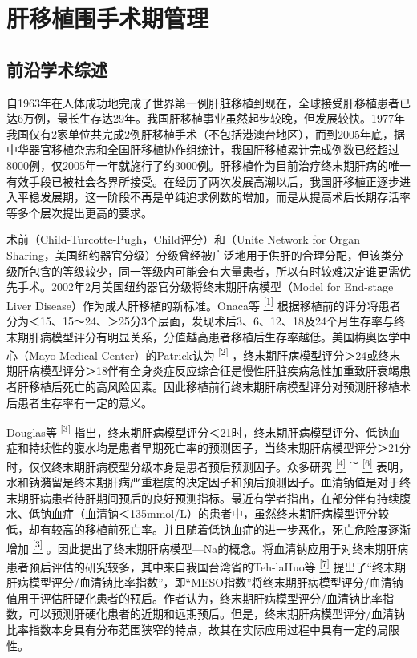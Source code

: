 \chapter{肝移植围手术期管理}

\section{前沿学术综述}

自1963年在人体成功地完成了世界第一例肝脏移植到现在，全球接受肝移植患者已达6万例，最长生存达29年。我国肝移植事业虽然起步较晚，但发展较快。1977年我国仅有2家单位共完成2例肝移植手术（不包括港澳台地区），而到2005年底，据中华器官移植杂志和全国肝移植协作组统计，我国肝移植累计完成例数已经超过8000例，仅2005年一年就施行了约3000例。肝移植作为目前治疗终末期肝病的唯一有效手段已被社会各界所接受。在经历了两次发展高潮以后，我国肝移植正逐步进入平稳发展期，这一阶段不再是单纯追求例数的增加，而是从提高术后长期存活率等多个层次提出更高的要求。

术前（Child-Turcotte-Pugh，Child评分）和（Unite Network for Organ
Sharing，美国纽约器官分级）分级曾经被广泛地用于供肝的合理分配，但该类分级所包含的等级较少，同一等级内可能会有大量患者，所以有时较难决定谁更需优先手术。2002年2月美国纽约器官分级将终末期肝病模型（Model
for End-stage Liver Disease）作为成人肝移植的新标准。Onaca等
\protect\hyperlink{text00020.htmlux5cux23ch1-19}{\textsuperscript{{[}1{]}}}
根据移植前的评分将患者分为＜15、15～24、＞25分3个层面，发现术后3、6、12、18及24个月生存率与终末期肝病模型评分有明显关系，分值越高患者移植后生存率越低。美国梅奥医学中心（Mayo
Medical Center）的Patrick认为
\protect\hyperlink{text00020.htmlux5cux23ch2-19}{\textsuperscript{{[}2{]}}}
，终末期肝病模型评分＞24或终末期肝病模型评分＞18伴有全身炎症反应综合征是慢性肝脏疾病急性加重致肝衰竭患者肝移植后死亡的高风险因素。因此移植前行终末期肝病模型评分对预测肝移植术后患者生存率有一定的意义。

Douglas等
\protect\hyperlink{text00020.htmlux5cux23ch3-19}{\textsuperscript{{[}3{]}}}
指出，终末期肝病模型评分＜21时，终末期肝病模型评分、低钠血症和持续性的腹水均是患者早期死亡率的预测因子，当终末期肝病模型评分＞21分时，仅仅终末期肝病模型分级本身是患者预后预测因子。众多研究
\protect\hyperlink{text00020.htmlux5cux23ch4-19}{\textsuperscript{{[}4{]}}}
\textsuperscript{～}
\protect\hyperlink{text00020.htmlux5cux23ch6-19}{\textsuperscript{{[}6{]}}}
表明，水和钠潴留是终末期肝病严重程度的决定因子和预后预测因子。血清钠值是对于终末期肝病患者待肝期间预后的良好预测指标。最近有学者指出，在部分伴有持续腹水、低钠血症（血清钠＜135mmol/L）的患者中，虽然终末期肝病模型评分较低，却有较高的移植前死亡率。并且随着低钠血症的进一步恶化，死亡危险度逐渐增加
\protect\hyperlink{text00020.htmlux5cux23ch3-19}{\textsuperscript{{[}3{]}}}
。因此提出了终末期肝病模型---Na的概念。将血清钠应用于对终末期肝病患者预后评估的研究较多，其中来自我国台湾省的Teh-laHuo等
\protect\hyperlink{text00020.htmlux5cux23ch7-19}{\textsuperscript{{[}7{]}}}
提出了“终末期肝病模型评分/血清钠比率指数”，即“MESO指数”将终末期肝病模型评分/血清钠值用于评估肝硬化患者的预后。作者认为，终末期肝病模型评分/血清钠比率指数，可以预测肝硬化患者的近期和远期预后。但是，终末期肝病模型评分/血清钠比率指数本身具有分布范围狭窄的特点，故其在实际应用过程中具有一定的局限性。

